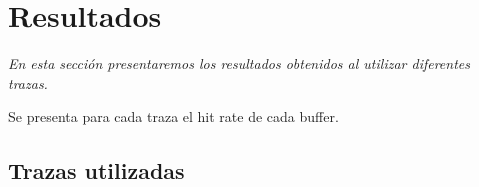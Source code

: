 \section{Resultados}

\textsl{En esta secci\'on presentaremos los resultados obtenidos 
al utilizar diferentes trazas.}

\vspace*{0.3cm}

Se presenta para cada traza el hit rate de cada buffer.

\subsection{Trazas utilizadas}


            
            
            


